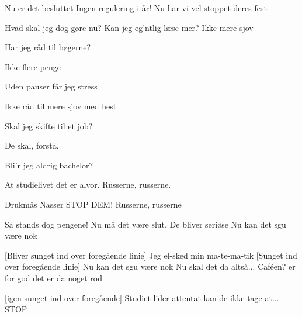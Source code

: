 \documentclass[a4paper,11pt]{article}
\begin{document}
\begin{song}
Nu er det besluttet
 Ingen regulering i år!
 Nu har vi vel stoppet deres fest

 Hvad skal jeg dog gøre nu? Kan jeg eg'ntlig læse mer?
 Ikke mere sjov

 Har jeg råd til bøgerne?

 Ikke flere penge

 Uden pauser får jeg stress

 Ikke råd til mere sjov med hest

 Skal jeg skifte til et job?

 De skal, forstå.

 Bli'r jeg aldrig bachelor?

 At studielivet det er alvor.
Russerne, russerne.

 Drukmås 
 Nasser 
 STOP DEM!
 Russerne, russerne

 Så stands dog pengene!
 Nu må det være slut.
De bliver seriøse
Nu kan det sgu være nok

[Bliver sunget ind over foregående linie] Jeg el-sked min ma-te-ma-tik
[Sunget ind over foregående linie]
 Nu kan det sgu være nok
 Nu skal det da altså...
 Caféen? er for god
det er da noget rod

[igen sunget ind over foregående] Studiet lider attentat
kan de ikke tage at...
 STOP
\end{song}
\end{document}
